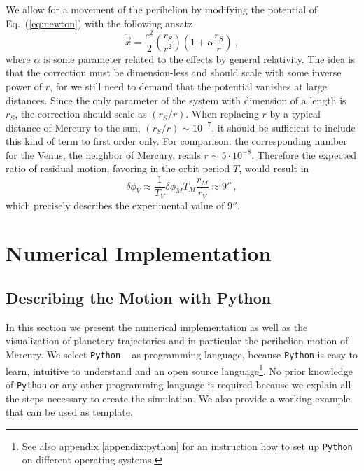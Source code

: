 \documentclass[12pt]{iopart}
\newcommand{\python}[0]{\texttt{Python} }
\begin{document}
We allow for a movement of the perihelion by modifying the potential of Eq.~(\ref{eq:newton}) with the following ansatz
\begin{equation}
\ddot{\vec x} = \frac{c^2}{2}\left(\frac{r_S}{r^2}\right)\left(1+\alpha\frac{r_S}{r}\right) \ ,
\label{eq:newton_art}
\end{equation}
where $\alpha$ is some parameter related to the effects by general relativity.
The idea is that the correction must be dimension-less and should scale with some inverse power of $r$, for we still need to demand that the potential vanishes at large distances.
Since the only parameter of the system with dimension of a length is $r_S$, the correction should scale as $(r_S/r)$.
When replacing $r$ by a typical distance of Mercury to the sun, $(r_S/r)\sim 10^{-7}$, it should be sufficient to include this kind of term to first order only.
For comparison: the corresponding number for the Venus, the neighbor of Mercury, reads $r \sim 5 \cdot 10^{-8}$.
Therefore the expected ratio of residual motion, favoring in the orbit period $T$, would result in
\begin{equation}
	\delta \phi_V \approx \frac{1}{T_V} \delta \phi_M T_M \frac{r_M}{r_V} \approx 9'' \, ,
\end{equation}
which precisely describes the experimental value of $9''$.



\section{Numerical Implementation}\label{sec:Numerical Implementation}

\subsection{Describing the Motion with Python}

In this section we present the numerical implementation as well as the visualization of planetary trajectories and in
particular
the perihelion motion of Mercury.  We select \python~\cite{} as  programming language, because \python is easy to learn, 
intuitive to understand and an open source language\footnote{See also appendix \ref{appendix:python} for an instruction 
how to set up \python on different operating systems.}.  No prior knowledge of \python or any other programming language 
is required because we explain all the steps necessary to create the simulation.  We also provide a working 
example \cite{}
%
 that can be used as template.
%
\end{document}
